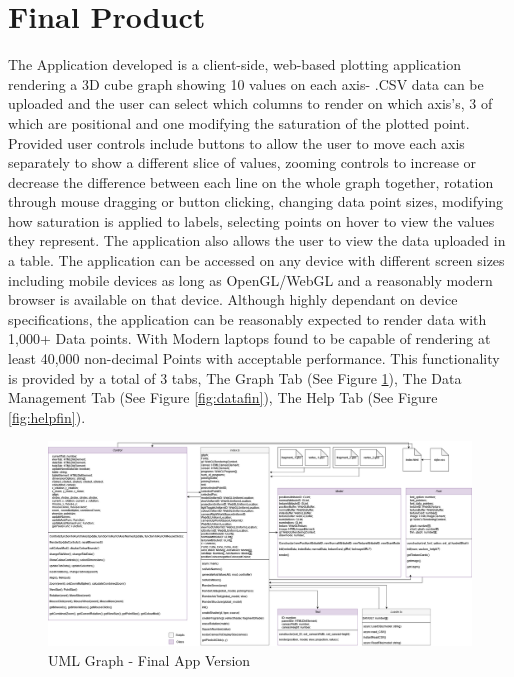 \section{Final Product}
The Application developed is a client-side, web-based plotting application rendering a 3D cube graph showing 10 values on each axis- .CSV data can be uploaded and the user can select which columns to render on which axis's, 3 of which are positional and one modifying the saturation of the plotted point.
Provided user controls include buttons to allow the user to move each axis separately to show a different slice of values, zooming controls to increase or decrease the difference between each line on the whole graph together, rotation through mouse dragging or button clicking, changing data point sizes, modifying how saturation is applied to labels, selecting points on hover to view the values they represent. The application also allows the user to view the data uploaded in a table.
The application can be accessed on any device with different screen sizes including mobile devices as long as OpenGL/WebGL and a reasonably modern browser is available on that device. Although highly dependant on device specifications, the application can be reasonably expected to render data with 1,000+ Data points. With Modern laptops found to be capable of rendering at least 40,000 non-decimal Points with acceptable performance.
This functionality is provided by a total of 3 tabs, The Graph Tab (See Figure \ref{fig:graphfin}), The Data Management Tab (See Figure \ref{fig:datafin}), The Help Tab (See Figure \ref{fig:helpfin}).

\begin{figure}[h]
    \centering
    \includegraphics[width=1\textwidth]{author-files/figures/UML_All_fin.drawio.png}
    \caption{UML Graph - Final App Version}
    \label{fig:graphfin}
\end{figure}